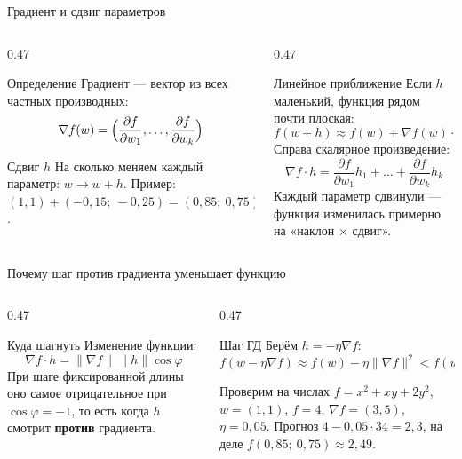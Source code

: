 \begin{frame}[c]{Градиент и сдвиг параметров}
  \begin{columns}[T]
    \begin{column}{0.47\textwidth}
      \begin{block}{Определение}
        \small
        Градиент --- вектор из всех частных производных:
        \[\nabla f(w) = \Bigl(\frac{\partial f}{\partial w_1}, \dots, \frac{\partial f}{\partial w_k}\Bigr)\]
      \end{block}
      \begin{block}{Сдвиг $h$}
        \small
        На сколько меняем каждый параметр: $w \to w + h$.
        Пример: $(1, 1) + (-0{,}15;\ -0{,}25) = (0{,}85;\ 0{,}75)$.
      \end{block}
    \end{column}
    \begin{column}{0.47\textwidth}
      \begin{block}{Линейное приближение}
        \small
        Если $h$ маленький, функция рядом почти плоская:
        \[f(w + h) \approx f(w) + \nabla f(w)\cdot h\]
        Справа скалярное произведение:
        \[\nabla f\cdot h = \frac{\partial f}{\partial w_1} h_1 + \dots + \frac{\partial f}{\partial w_k} h_k\]
        Каждый параметр сдвинули --- функция изменилась примерно на «наклон $\times$ сдвиг».
      \end{block}
    \end{column}
  \end{columns}
\end{frame}

\begin{frame}[c]{Почему шаг против градиента уменьшает функцию}
  \begin{columns}[T]
    \begin{column}{0.47\textwidth}
      \begin{block}{Куда шагнуть}
        \small
        Изменение функции:
        \[\nabla f\cdot h = \lVert\nabla f\rVert\,\lVert h\rVert\cos\varphi\]
        При шаге фиксированной длины оно самое отрицательное при $\cos\varphi = -1$,
        то есть когда $h$ смотрит \textbf{против} градиента.
      \end{block}
    \end{column}
    \begin{column}{0.47\textwidth}
      \begin{block}{Шаг ГД}
        \small
        Берём $h = -\eta\nabla f$:
        \[f(w - \eta\nabla f) \approx f(w) - \eta\lVert\nabla f\rVert^2 < f(w)\]
      \end{block}
      \begin{block}{Проверим на числах}
        \small
        $f = x^2 + xy + 2y^2$, $w = (1, 1)$, $f = 4$, $\nabla f = (3, 5)$, $\eta = 0{,}05$.
        Прогноз $4 - 0{,}05\cdot 34 = 2{,}3$, на деле $f(0{,}85;\ 0{,}75) \approx 2{,}49$.
      \end{block}
    \end{column}
  \end{columns}
\end{frame}


